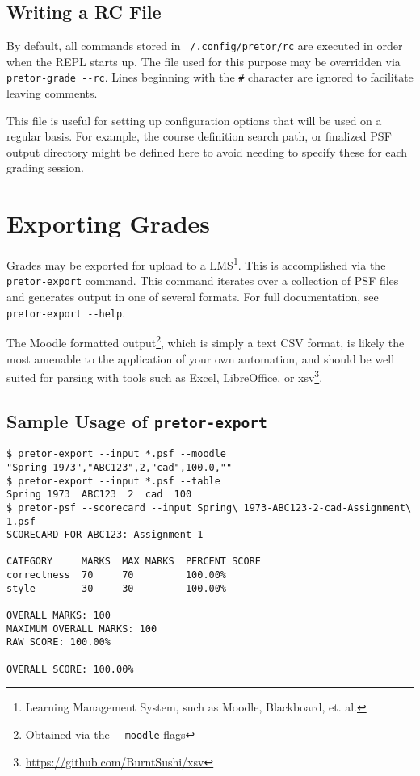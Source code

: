 \documentclass{book}
\begin{document}
\subsection{Writing a RC File}

By default, all commands stored in \texttt{~/.config/pretor/rc} are executed in
order when the REPL starts up. The file used for this purpose may be overridden
via \texttt{pretor-grade -{}-rc}. Lines beginning with the \texttt{\#}
character are ignored to facilitate leaving comments.

This file is useful for setting up configuration options that will be used on a
regular basis. For example, the course definition search path, or finalized PSF
output directory might be defined here to avoid needing to specify these for
each grading session.

\section{Exporting Grades}

Grades may be exported for upload to a LMS\footnote{Learning Management System,
such as Moodle, Blackboard, et. al.}. This is accomplished via the
\texttt{pretor-export} command. This command iterates over a collection of PSF
files and generates output in one of several formats. For full documentation,
see \texttt{pretor-export -{}-help}.

The Moodle formatted output\footnote{Obtained via the \texttt{-{}-moodle}
flags}, which is simply a text CSV format, is likely the most amenable to the
application of your own automation, and should be well suited for parsing with
tools such as Excel, LibreOffice, or
xsv\footnote{\url{https://github.com/BurntSushi/xsv}}.

\subsection{Sample Usage of \texttt{pretor-export}}

\begin{verbatim}
$ pretor-export --input *.psf --moodle
"Spring 1973","ABC123",2,"cad",100.0,""
$ pretor-export --input *.psf --table
Spring 1973  ABC123  2  cad  100
$ pretor-psf --scorecard --input Spring\ 1973-ABC123-2-cad-Assignment\ 1.psf
SCORECARD FOR ABC123: Assignment 1

CATEGORY     MARKS  MAX MARKS  PERCENT SCORE
correctness  70     70         100.00%
style        30     30         100.00%

OVERALL MARKS: 100
MAXIMUM OVERALL MARKS: 100
RAW SCORE: 100.00%

OVERALL SCORE: 100.00%
\end{verbatim}
\end{document}
